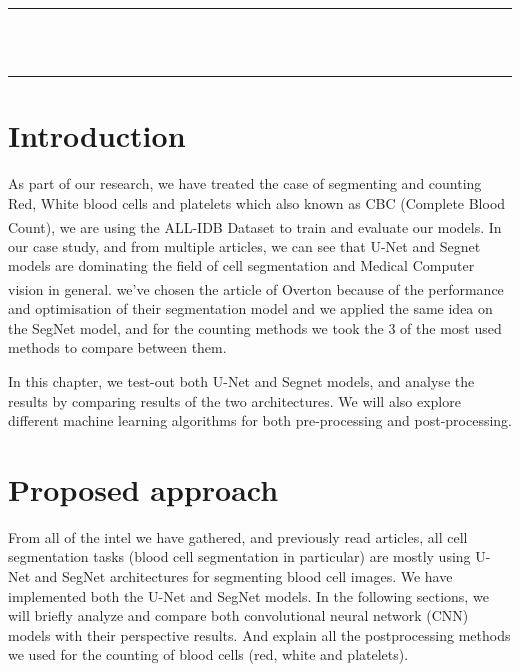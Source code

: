 \thispagestyle{empty}
\vspace*{\fill}
\begin{center}
    {\color{Black} \rule{\linewidth}{1.2mm} }\\
\vspace{0.25in}
{\centering{}}
\vspace{0.35in}\\
    {\color{Black} \rule{\linewidth}{1.2mm} }
\end{center}
\vspace*{\fill}
\setcounter{section}{0}

\newpage

\section{Introduction}
\vspace{0.2in}
\hspace{\parindent}
As part of our research, we have treated the case of segmenting and counting Red, White blood cells and platelets which also known as CBC (Complete Blood Count), we are using the ALL-IDB\textsuperscript{\cite{pm77-2n23-20}} Dataset to train and evaluate our models.
In our case study, and from multiple articles, we can see that U-Net and Segnet models are dominating the field of cell segmentation and Medical Computer vision in general. we've chosen the article of Overton \textsuperscript{\cite{10.1007/978-3-030-44584-3_31}} because of the performance and optimisation of their segmentation model and we applied the same idea on the SegNet model, and for the counting methods we took the 3 of the most used methods to compare between them.

In this chapter, we test-out both U-Net and Segnet models, and analyse the results by comparing results of the two architectures.
We will also explore different machine learning algorithms for both pre-processing and post-processing.

\section{Proposed approach}
\vspace{0.2in}
\hspace{\parindent}
From all of the intel we have gathered, and previously read articles, all cell segmentation tasks (blood cell segmentation in particular) are mostly using U-Net and SegNet architectures for segmenting blood cell images.
We have implemented both the U-Net and SegNet models.
In the following sections, we will briefly analyze and compare both convolutional neural network (CNN) models with their perspective results.
And explain all the postprocessing methods we used for the counting of blood cells (red, white and platelets).

